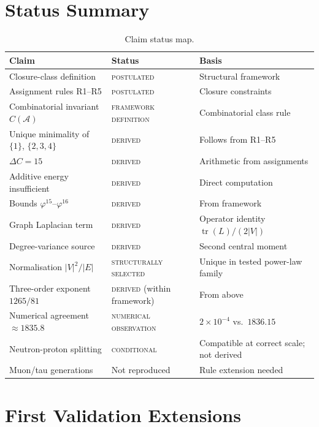 \documentclass[12pt]{article}
\newcommand{\Acal}{\mathcal{A}}
\newcommand{\phig}{\varphi}
\begin{document}
\section{Status Summary}\label{sec:status}

\begin{table}[ht]
\centering
\caption{Claim status map.}
\label{tab:status}
\begin{tabular}{@{}lll@{}}
\toprule
Claim & Status & Basis \\
\midrule
Closure-class definition & \textsc{postulated} & Structural framework \\
Assignment rules R1--R5 & \textsc{postulated} & Closure constraints \\
Combinatorial invariant $C(\Acal)$ & \textsc{framework definition} & Combinatorial class rule \\
Unique minimality of $\{1\}$, $\{2,3,4\}$ & \textsc{derived} & Follows from R1--R5 \\
$\Delta C = 15$ & \textsc{derived} & Arithmetic from assignments \\
Additive energy insufficient & \textsc{derived} & Direct computation \\
Bounds $\phig^{15}$--$\phig^{16}$ & \textsc{derived} & From framework \\
Graph Laplacian term & \textsc{derived} & Operator identity $\operatorname{tr}(L)/(2|V|)$ \\
Degree-variance source & \textsc{derived} & Second central moment \\
Normalisation $|V|^2/|E|$ & \textsc{structurally selected} & Unique in tested power-law family \\
Three-order exponent $1265/81$ & \textsc{derived} (within framework) & From above \\
Numerical agreement $\approx 1835.8$ & \textsc{numerical observation} & $2 \times 10^{-4}$ vs.\ $1836.15$ \\
Neutron-proton splitting & \textsc{conditional} & Compatible at correct scale; not derived \\
Muon/tau generations & Not reproduced & Rule extension needed \\
\bottomrule
\end{tabular}
\end{table}

\section{First Validation Extensions}\label{sec:validation}
\end{document}

